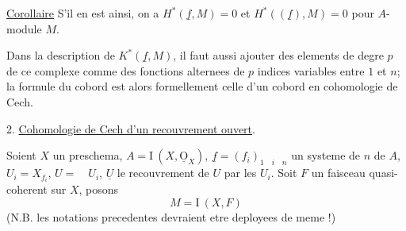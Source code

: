 \uline{Corollaire} S'il en est ainsi, on a $H^{*}(\underline f,M)=0$ et $H^{*}((\underline f),M)=0$ pour  $A$-module $M$.

Dans la description de $K^{*}(\underline f,M)$, il faut aussi ajouter  des elements de degre $p$ de ce complexe comme des fonctions alternees de $p$ indices variables entre $1$ et $n$; la formule du cobord est alors formellement celle d'un cobord en cohomologie de Cech.

2. \uline{Cohomologie de Cech d'un recouvrement ouvert}.

Soient $X$ un preschema, $A=\mathrm{I}\ (X,\underline{\mathrm O}_{X})$, $\underline f=(f_i)_{1\quad i\quad n}$ un systeme de $n$  de $A$, $U_i=X_{f_i}$, $U=\quad U_i$, $\underline U$ le recouvrement de $U$ par les $U_i$. Soit $F$ un faisceau quasi-coherent sur $X$, posons
\[
M=\mathrm{I}\ (X,F)
\]
(N.B. les notations precedentes devraient etre deployees de meme !)

